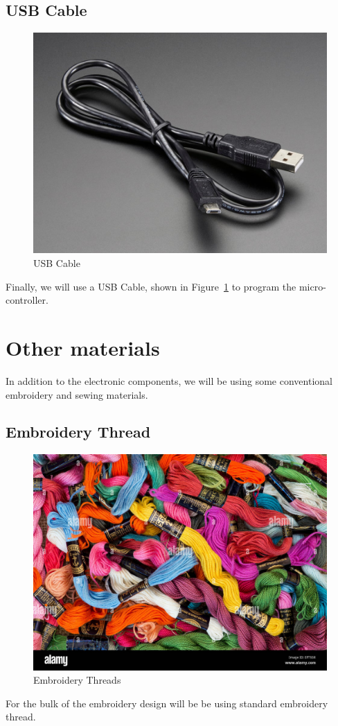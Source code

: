 \documentclass[letterpaper,twoside,12pt]{article}
\begin{document}
\subsection{USB Cable}
\begin{figure}[hbpt]\begin{centering}%
\includegraphics[width=5in]{USBCable.jpg}
\caption{USB Cable}
\label{fig:usbcable}
\end{centering}\end{figure}
Finally, we will use a USB Cable, shown in Figure~\ref{fig:usbcable} to 
program the micro-controller.
\section{Other materials}
In addition to the electronic components, we will be using some conventional 
embroidery and sewing materials.
\clearpage
\subsection{Embroidery Thread}
\begin{figure}[hbpt]\begin{centering}%
\includegraphics[width=5in]{embroiderythreads.jpg}
\caption{Embroidery Threads}
\label{fig:embroiderythreads}
\end{centering}\end{figure}
For the bulk of the embroidery design will be be using standard embroidery 
thread.
\clearpage
\end{document}
